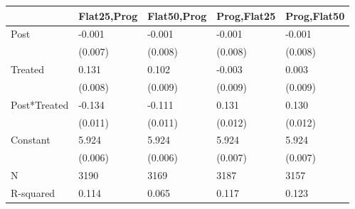\begin{tabular}{lllll}
\toprule
 & Flat25,Prog & Flat50,Prog & Prog,Flat25 & Prog,Flat50 \\
\midrule
Post & -0.001 & -0.001 & -0.001 & -0.001 \\
 & (0.007) & (0.008) & (0.008) & (0.008) \\
Treated & 0.131 & 0.102 & -0.003 & 0.003 \\
 & (0.008) & (0.009) & (0.009) & (0.009) \\
Post*Treated & -0.134 & -0.111 & 0.131 & 0.130 \\
 & (0.011) & (0.011) & (0.012) & (0.012) \\
Constant & 5.924 & 5.924 & 5.924 & 5.924 \\
 & (0.006) & (0.006) & (0.007) & (0.007) \\
N & 3190 & 3169 & 3187 & 3157 \\
R-squared & 0.114 & 0.065 & 0.117 & 0.123 \\
\bottomrule
\end{tabular}
